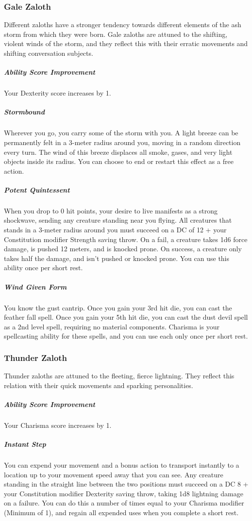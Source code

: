 \begin{linenumbers}
\subsubsection{Gale Zaloth}
Different zaloths have a stronger tendency towards different elements of the ash storm from which they were born.
Gale zaloths are attuned to the shifting, violent winds of the storm, and they reflect this with their erratic movements and shifting conversation subjects.

\subparagraph{Ability Score Improvement} Your Dexterity score increases by 1.

\subparagraph{Stormbound} Wherever you go, you carry some of the storm with you.
A light breeze can be permanently felt in a 3-meter radius around you, moving in a random direction every turn.
The wind of this breeze displaces all smoke, gases, and very light objects inside its radius.
You can choose to end or restart this effect as a free action.

\subparagraph{Potent Quintessent} When you drop to 0 hit points, your desire to live manifests as a strong shockwave, sending any creature standing near you flying.
All creatures that stands in a 3-meter radius around you must succeed on a DC of 12 + your Constitution modifier Strength saving throw.
On a fail, a creature takes 1d6 force damage, is pushed 12 meters, and is knocked prone.
On success, a creature only takes half the damage, and isn't pushed or knocked prone.
You can use this ability once per short rest.

\subparagraph{Wind Given Form} You know the gust cantrip.
Once you gain your 3rd hit die, you can cast the feather fall spell.
Once you gain your 5th hit die, you can cast the dust devil spell as a 2nd level spell, requiring no material components.
Charisma is your spellcasting ability for these spells, and you can use each only once per short rest.

\subsubsection{Thunder Zaloth}
Thunder zaloths are attuned to the fleeting, fierce lightning.
They reflect this relation with their quick movements and sparking personalities.

\subparagraph{Ability Score Improvement} Your Charisma score increases by 1.

\subparagraph{Instant Step} You can expend your movement and a bonus action to transport instantly to a location up to your movement speed away that you can see.
Any creature standing in the straight line between the two positions must succeed on a DC 8 + your Constitution modifier Dexterity saving throw, taking 1d8 lightning damage on a failure.
You can do this a number of times equal to your Charisma modifier (Minimum of 1), and regain all expended uses when you complete a short rest.


\end{linenumbers}

